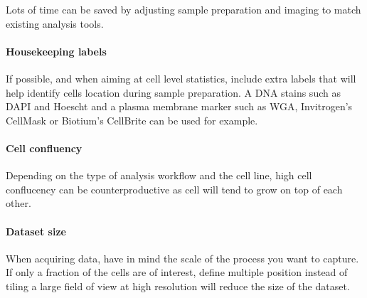 Lots of time can be saved by adjusting sample preparation and imaging to match existing  analysis tools.

\paragraph{Housekeeping labels} If possible, and when aiming at cell level statistics, include extra labels that will help identify cells location during sample preparation. A DNA stains such as DAPI and Hoescht and a plasma membrane marker such as WGA, Invitrogen's CellMask or Biotium's CellBrite can be used for example. 

\paragraph{Cell confluency} Depending on the type of analysis workflow and the cell line, high cell conflucency can be counterproductive as cell will tend to grow on top of each other.

\paragraph{Dataset size} When acquiring data, have in mind the scale of the process you want to capture. If only a fraction of the cells are of interest, define multiple position instead of tiling a large field of view at high resolution will reduce the size of the dataset.





